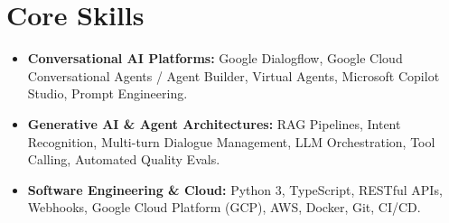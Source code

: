 \documentclass[a4paper,10pt]{article}
\begin{document}
\section{Core Skills}
\begin{itemize}
  \item \textbf{Conversational AI Platforms:} Google Dialogflow, Google Cloud Conversational Agents / Agent Builder, Virtual Agents, Microsoft Copilot Studio, Prompt Engineering.
  \item \textbf{Generative AI \& Agent Architectures:} RAG Pipelines, Intent Recognition, Multi-turn Dialogue Management, LLM Orchestration, Tool Calling, Automated Quality Evals.
  \item \textbf{Software Engineering \& Cloud:} Python 3, TypeScript, RESTful APIs, Webhooks, Google Cloud Platform (GCP), AWS, Docker, Git, CI/CD.
\end{itemize}
\end{document}
